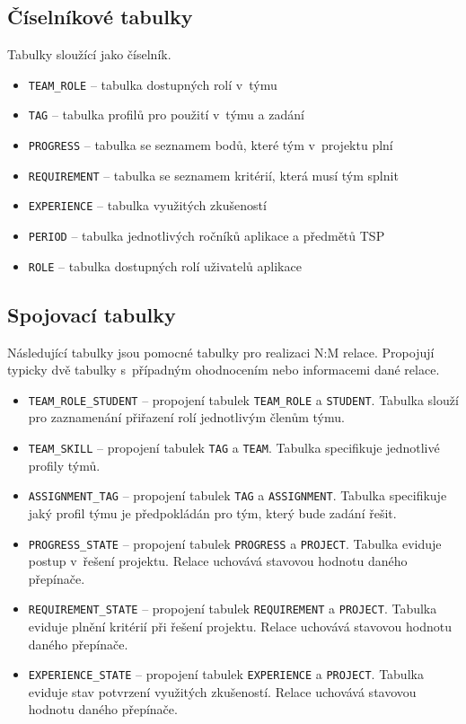 \documentclass[czech,BP]{thesiskiv}
\begin{document}
		\subsection{Číselníkové tabulky}
		\par Tabulky sloužící jako číselník.
		\begin{itemize}
			\item \texttt{TEAM\_ROLE} -- tabulka dostupných rolí v~týmu
			\item \texttt{TAG} -- tabulka profilů pro použití v~týmu a zadání
			\item \texttt{PROGRESS} -- tabulka se seznamem bodů, které tým v~projektu plní
			\item \texttt{REQUIREMENT} -- tabulka se seznamem kritérií, která musí tým splnit
			\item \texttt{EXPERIENCE} -- tabulka využitých zkušeností
			\item \texttt{PERIOD} -- tabulka jednotlivých ročníků aplikace a předmětů TSP
			\item \texttt{ROLE} -- tabulka dostupných rolí uživatelů aplikace
		\end{itemize}
		\subsection{Spojovací tabulky}
			\par Následující tabulky jsou pomocné tabulky pro realizaci N:M relace. Propojují typicky dvě tabulky s~případným ohodnocením nebo informacemi dané relace.
			\begin{itemize}
				\item \texttt{TEAM\_ROLE\_STUDENT} -- propojení tabulek \texttt{TEAM\_ROLE} a \texttt{STUDENT}. Tabulka slouží pro zaznamenání přiřazení rolí jednotlivým členům týmu.
				\item \texttt{TEAM\_SKILL} -- propojení tabulek \texttt{TAG} a \texttt{TEAM}. Tabulka specifikuje jednotlivé profily týmů.
				\item \texttt{ASSIGNMENT\_TAG} -- propojení tabulek \texttt{TAG} a \texttt{ASSIGNMENT}. Tabulka specifikuje jaký profil týmu je předpokládán pro tým, který bude zadání řešit.
				\item \texttt{PROGRESS\_STATE} -- propojení tabulek \texttt{PROGRESS} a \texttt{PROJECT}. Tabulka eviduje postup v~řešení projektu. Relace uchovává stavovou hodnotu daného přepínače.
				\item \texttt{REQUIREMENT\_STATE} -- propojení tabulek \texttt{REQUIREMENT} a \texttt{PROJECT}. Tabulka eviduje plnění kritérií při řešení projektu. Relace uchovává stavovou hodnotu daného přepínače.
				\item \texttt{EXPERIENCE\_STATE} -- propojení tabulek \texttt{EXPERIENCE} a \texttt{PROJECT}. Tabulka eviduje stav potvrzení využitých zkušeností. Relace uchovává stavovou hodnotu daného přepínače.
			\end{itemize}
\end{document}
